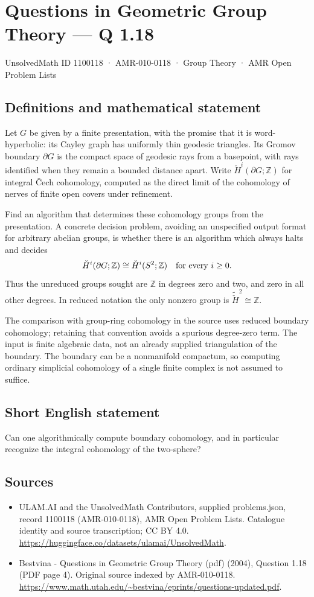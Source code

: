 \documentclass[11pt,a4paper]{article}
\begin{document}
\section*{Questions in Geometric Group Theory — Q 1.18}\label{1100118}
{\small UnsolvedMath ID 1100118 · AMR-010-0118 · Group Theory · AMR Open Problem Lists}
\subsection{Definitions and mathematical statement}
Let $G$ be given by a finite presentation, with the promise that it is word-hyperbolic: its Cayley graph has uniformly thin geodesic triangles. Its Gromov boundary $\partial G$ is the compact space of geodesic rays from a basepoint, with rays identified when they remain a bounded distance apart. Write $\check H^i(\partial G;\mathbb Z)$ for integral \v{C}ech cohomology, computed as the direct limit of the cohomology of nerves of finite open covers under refinement.

Find an algorithm that determines these cohomology groups from the presentation. A concrete decision problem, avoiding an unspecified output format for arbitrary abelian groups, is whether there is an algorithm which always halts and decides
\[
 \check H^i(\partial G;\mathbb Z)\cong
 \check H^i(S^2;\mathbb Z)\quad\hbox{for every }i\geq0.
\]
Thus the unreduced groups sought are $\mathbb Z$ in degrees zero and two, and zero in all other degrees. In reduced notation the only nonzero group is $\widetilde{\check H}^{2}\cong\mathbb Z$.

The comparison with group-ring cohomology in the source uses reduced boundary cohomology; retaining that convention avoids a spurious degree-zero term. The input is finite algebraic data, not an already supplied triangulation of the boundary. The boundary can be a nonmanifold compactum, so computing ordinary simplicial cohomology of a single finite complex is not assumed to suffice.
\subsection{Short English statement}
Can one algorithmically compute boundary cohomology, and in particular recognize the integral cohomology of the two-sphere?
\subsection{Sources}
\begin{itemize}
\item[S1] ULAM.AI and the UnsolvedMath Contributors, supplied problems.json, record 1100118 (AMR-010-0118), AMR Open Problem Lists. Catalogue identity and source transcription; CC BY 4.0.
\url{https://huggingface.co/datasets/ulamai/UnsolvedMath}.
\item[S2] Bestvina - Questions in Geometric Group Theory (pdf) (2004), Question 1.18 (PDF page 4). Original source indexed by AMR-010-0118.
\url{https://www.math.utah.edu/~bestvina/eprints/questions-updated.pdf}.
\end{itemize}
\end{document}
